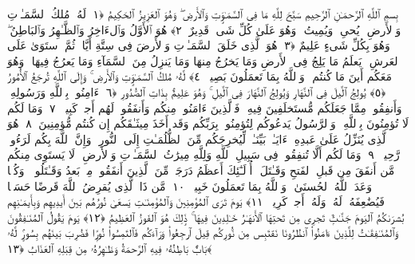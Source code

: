 
  
    
  
    
    

\nopagebreak
  بِسمِ ٱللَّهِ ٱلرَّحمَـٰنِ ٱلرَّحِيمِ
  سَبَّحَ لِلَّهِ مَا فِى ٱلسَّمَـٰوَٟتِ وَٱلأَرضِ ۖ وَهُوَ ٱلعَزِيزُ ٱلحَكِيمُ ﴿١﴾
 لَهُۥ مُلكُ ٱلسَّمَـٰوَٟتِ وَٱلأَرضِ ۖ يُحىِۦ وَيُمِيتُ ۖ وَهُوَ عَلَىٰ كُلِّ شَىءٍۢ قَدِيرٌ ﴿٢﴾
 هُوَ ٱلأَوَّلُ وَٱلءَاخِرُ وَٱلظَّـٰهِرُ وَٱلبَاطِنُ ۖ وَهُوَ بِكُلِّ شَىءٍ عَلِيمٌ ﴿٣﴾
 هُوَ ٱلَّذِى خَلَقَ ٱلسَّمَـٰوَٟتِ وَٱلأَرضَ فِى سِتَّةِ أَيَّامٍۢ ثُمَّ ٱستَوَىٰ عَلَى ٱلعَرشِ ۚ يَعلَمُ مَا يَلِجُ فِى ٱلأَرضِ وَمَا يَخرُجُ مِنهَا وَمَا يَنزِلُ مِنَ ٱلسَّمَآءِ وَمَا يَعرُجُ فِيهَا ۖ وَهُوَ مَعَكُم أَينَ مَا كُنتُم ۚ وَٱللَّهُ بِمَا تَعمَلُونَ بَصِيرٌۭ ﴿٤﴾
 لَّهُۥ مُلكُ ٱلسَّمَـٰوَٟتِ وَٱلأَرضِ ۚ وَإِلَى ٱللَّهِ تُرجَعُ ٱلأُمُورُ ﴿٥﴾
 يُولِجُ ٱلَّيلَ فِى ٱلنَّهَارِ وَيُولِجُ ٱلنَّهَارَ فِى ٱلَّيلِ ۚ وَهُوَ عَلِيمٌۢ بِذَاتِ ٱلصُّدُورِ ﴿٦﴾
 ءَامِنُوا۟ بِٱللَّهِ وَرَسُولِهِۦ وَأَنفِقُوا۟ مِمَّا جَعَلَكُم مُّستَخلَفِينَ فِيهِ ۖ فَٱلَّذِينَ ءَامَنُوا۟ مِنكُم وَأَنفَقُوا۟ لَهُم أَجرٌۭ كَبِيرٌۭ ﴿٧﴾
 وَمَا لَكُم لَا تُؤمِنُونَ بِٱللَّهِ ۙ وَٱلرَّسُولُ يَدعُوكُم لِتُؤمِنُوا۟ بِرَبِّكُم وَقَد أَخَذَ مِيثَـٰقَكُم إِن كُنتُم مُّؤمِنِينَ ﴿٨﴾
 هُوَ ٱلَّذِى يُنَزِّلُ عَلَىٰ عَبدِهِۦٓ ءَايَـٰتٍۭ بَيِّنَـٰتٍۢ لِّيُخرِجَكُم مِّنَ ٱلظُّلُمَـٰتِ إِلَى ٱلنُّورِ ۚ وَإِنَّ ٱللَّهَ بِكُم لَرَءُوفٌۭ رَّحِيمٌۭ ﴿٩﴾
 وَمَا لَكُم أَلَّا تُنفِقُوا۟ فِى سَبِيلِ ٱللَّهِ وَلِلَّهِ مِيرَٰثُ ٱلسَّمَـٰوَٟتِ وَٱلأَرضِ ۚ لَا يَستَوِى مِنكُم مَّن أَنفَقَ مِن قَبلِ ٱلفَتحِ وَقَـٰتَلَ ۚ أُو۟لَـٰٓئِكَ أَعظَمُ دَرَجَةًۭ مِّنَ ٱلَّذِينَ أَنفَقُوا۟ مِنۢ بَعدُ وَقَـٰتَلُوا۟ ۚ وَكُلًّۭا وَعَدَ ٱللَّهُ ٱلحُسنَىٰ ۚ وَٱللَّهُ بِمَا تَعمَلُونَ خَبِيرٌۭ ﴿١٠﴾
 مَّن ذَا ٱلَّذِى يُقرِضُ ٱللَّهَ قَرضًا حَسَنًۭا فَيُضَٰعِفَهُۥ لَهُۥ وَلَهُۥٓ أَجرٌۭ كَرِيمٌۭ ﴿١١﴾
 يَومَ تَرَى ٱلمُؤمِنِينَ وَٱلمُؤمِنَـٰتِ يَسعَىٰ نُورُهُم بَينَ أَيدِيهِم وَبِأَيمَـٰنِهِم بُشرَىٰكُمُ ٱليَومَ جَنَّـٰتٌۭ تَجرِى مِن تَحتِهَا ٱلأَنهَـٰرُ خَـٰلِدِينَ فِيهَا ۚ ذَٟلِكَ هُوَ ٱلفَوزُ ٱلعَظِيمُ ﴿١٢﴾
 يَومَ يَقُولُ ٱلمُنَـٰفِقُونَ وَٱلمُنَـٰفِقَـٰتُ لِلَّذِينَ ءَامَنُوا۟ ٱنظُرُونَا نَقتَبِس مِن نُّورِكُم قِيلَ ٱرجِعُوا۟ وَرَآءَكُم فَٱلتَمِسُوا۟ نُورًۭا فَضُرِبَ بَينَهُم بِسُورٍۢ لَّهُۥ بَابٌۢ بَاطِنُهُۥ فِيهِ ٱلرَّحمَةُ وَظَـٰهِرُهُۥ مِن قِبَلِهِ ٱلعَذَابُ ﴿١٣﴾
